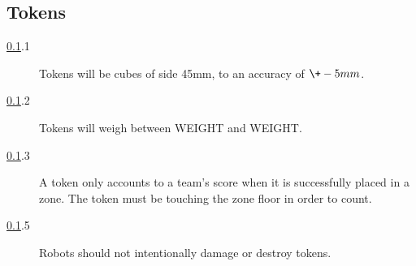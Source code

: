 \subsection {Tokens}
\label{tokens}

\begin {description} 
\item [\ref{tokens}.1] Tokens will be cubes of side 45mm, to an accuracy of $\+-5mm$.
\item [\ref{tokens}.2] Tokens will weigh between WEIGHT and WEIGHT.
\item [\ref{tokens}.3] A token only accounts to a team's score when it is successfully placed in a zone. The token must be touching the zone floor in order to count.
\item [\ref{tokens}.5] Robots should not intentionally damage or destroy tokens.
\end {description}

